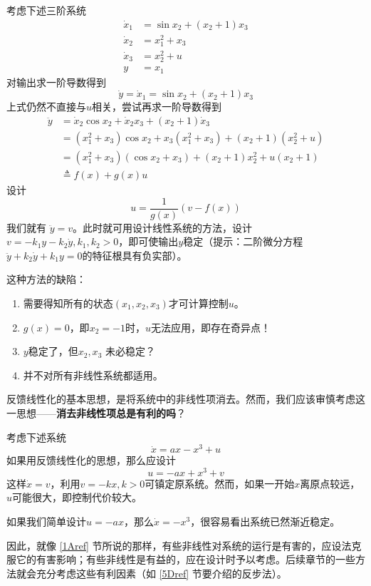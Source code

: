 \begin{example}
    考虑下述三阶系统
    \begin{align*}
  \dot{x}_1 & = \sin  x_2 + (x_2 + 1) x_3\\
  \dot{x}_2 & = x^2_1 + x_3\\
  \dot{x}_3 & = x^2_2 + u\\
  y & = x_1
\end{align*}
对输出求一阶导数得到
\[ \dot{y} = \dot{x}_1 = \sin  x_2 + (x_2 + 1) x_3 \]
上式仍然不直接与$u$相关，尝试再求一阶导数得到
\begin{align*}
  \ddot{y} & = \dot{x}_2 \cos  x_2 + \dot{x}_2 x_3 + (x_2 + 1) \dot{x}_3\\
  & = (x^2_1 + x_3) \cos  x_2 + x_3 (x^2_1 + x_3) + (x_2 + 1) (x^2_2 + u)\\
  & = (x^2_1 + x_3) (\cos  x_2 + x_3) + (x_2 + 1) x^2_2 + u (x_2 + 1)\\
  & \triangleq  f(x) + g(x)u
\end{align*}
设计 \[u = \frac{1}{g(x)} (v - f (x))\]
我们就有 $\ddot{y} = v$。此时就可用设计线性系统的方法，设计 $v = - k_1 y - k_2 \dot{y},k_1,k_2>0$，即可使输出$y$稳定（提示：二阶微分方程$\ddot{y}+k_2 \dot{y}+k_1 y=0$的特征根具有负实部）。
\end{example}

\begin{remark}  
    这种方法的缺陷：
  \begin{enumerate}
    \item 需要得知所有的状态$(x_1, x_2, x_3)$才可计算控制$u$。
    
    \item $g(x)=0$，即$x_2 = - 1$时，$u$无法应用，即存在奇异点！
    
    \item $y$稳定了，但$x_2, x_3$ 未必稳定？
    \item 并不对所有非线性系统都适用。
  \end{enumerate}
\end{remark}

反馈线性化的基本思想，是将系统中的非线性项消去。然而，我们应该审慎考虑这一思想——{\bf 消去非线性项总是有利的吗}？

\begin{example}
考虑下述系统
    \[\dot{x} = a  x - x^3 + u\]
如果用反馈线性化的思想，那么应设计\[u=-ax+x^3+v\]
这样$\dot{x}=v$，利用$v=-kx,k>0$可镇定原系统。然而，如果一开始$x$离原点较远，$u$可能很大，即控制代价较大。

如果我们简单设计$u=-ax$，那么$\dot{x}=-x^3$，很容易看出系统已然渐近稳定。

因此，就像 \ref{1Aref} 节所说的那样，有些非线性对系统的运行是有害的，应设法克服它的有害影响；有些非线性是有益的，应在设计时予以考虑。后续章节的一些方法就会充分考虑这些有利因素（如 \ref{5Dref} 节要介绍的反步法）。
\end{example}
